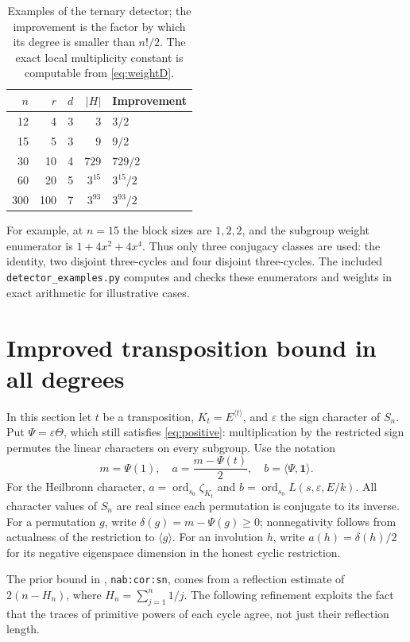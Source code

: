 \documentclass[11pt]{article}
\theoremstyle{remark}\newtheorem{remark}[theorem]{Remark}
\newcommand{\ord}{\operatorname{ord}}
\newcommand{\one}{\mathbf{1}}
\newcommand{\sgn}{\varepsilon}
\begin{document}
\begin{table}[ht]
\centering
\caption{Examples of the ternary detector; the improvement is the factor by which its degree is smaller than $n!/2$. The exact local multiplicity constant is computable from \eqref{eq:weightD}.}
\label{tab:examples}
\begin{tabular}{rrrrl}
\toprule
$n$&$r$&$d$&$|H|$&Improvement\\
\midrule
12&4&3&$3$&$3/2$\\
15&5&3&$9$&$9/2$\\
30&10&4&$729$&$729/2$\\
60&20&5&$3^{15}$&$3^{15}/2$\\
300&100&7&$3^{93}$&$3^{93}/2$\\
\bottomrule
\end{tabular}
\end{table}
For example, at $n=15$ the block sizes are $1,2,2$, and the subgroup weight enumerator is $1+4x^2+4x^4$. Thus only three conjugacy classes are used: the identity, two disjoint three-cycles and four disjoint three-cycles. The included \texttt{detector\_examples.py} computes and checks these enumerators and weights in exact arithmetic for illustrative cases.

\section{Improved transposition bound in all degrees}
In this section let $t$ be a transposition, $K_t=E^{\langle t\rangle}$, and $\sgn$ the sign character of $S_n$. Put $\Psi=\sgn\Theta$, which still satisfies \eqref{eq:positive}: multiplication by the restricted sign permutes the linear characters on every subgroup. Use the notation
\begin{equation}\label{eq:ab}
 m=\Psi(1),\quad a=\frac{m-\Psi(t)}2,\quad b=\langle\Psi,\one\rangle.
\end{equation}
For the Heilbronn character, $a=\ord_{s_0}\zeta_{K_t}$ and $b=\ord_{s_0}L(s,\sgn,E/k)$. All character values of $S_n$ are real since each permutation is conjugate to its inverse. For a permutation $g$, write $\delta(g)=m-\Psi(g)\ge0$; nonnegativity follows from actualness of the restriction to $\langle g\rangle$. For an involution $h$, write $a(h)=\delta(h)/2$ for its negative eigenspace dimension in the honest cyclic restriction.

The prior bound in \cite{proveit}, \texttt{nab:cor:sn}, comes from a reflection estimate of $2(n-H_n)$, where $H_n=\sum_{j=1}^n1/j$. The following refinement exploits the fact that the traces of primitive powers of each cycle agree, not just their reflection length.
\end{document}
